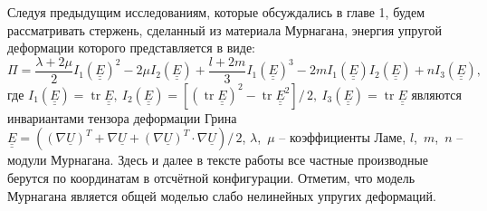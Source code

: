 \documentclass[12pt, a4paper]{report}
\DeclareMathOperator{\trace}{tr}
\newcommand{\lb}{\left (}
\newcommand{\rb}{\right )}
\newcommand{\lsq}{\left [}
\newcommand{\rsq}{\right ]}
\newcommand{\vect}[1]{\underline{#1}}
\newcommand{\tens}[1]{\underline{\underline{#1}}}
\begin{document}
Следуя предыдущим исследованиям, которые обсуждались в главе 1, будем рассматривать стержень, сделанный из материала Мурнагана, энергия упругой деформации которого представляется в виде:
\begin{equation}\label{2_murnaghan_pot}
\Pi = \frac{\lambda + 2\mu}{2}I_1(\tens{E})^2 - 2\mu I_2(\tens{E}) + \frac{l+2m}{3}I_1(\tens{E})^3 - 2m I_1(\tens{E}) I_2(\tens{E}) + n I_3(\tens{E}),
\end{equation}
где $I_1(\tens{E}) = \trace \tens{E},\  I_2(\tens{E}) = \lsq(\trace \tens{E})^2 - \trace \tens{E}^2\rsq/\,2,\ I_3(\tens{E}) = \trace \tens{E}$ являются инвариантами тензора деформации Грина
$\tens{E} = \lb (\nabla\vect{U})^T + \nabla\vect{U} + (\nabla\vect{U})^T\cdot\nabla\vect{U} \rb / \, 2$, 
$\lambda$,~$\mu$ -- коэффициенты Ламе, $l$,~$m$,~$n$ -- модули Мурнагана. Здесь и далее в тексте работы все частные производные берутся по координатам в отсчётной конфигурации. Отметим, что модель Мурнагана является общей моделью слабо нелинейных упругих деформаций.


\end{document}
